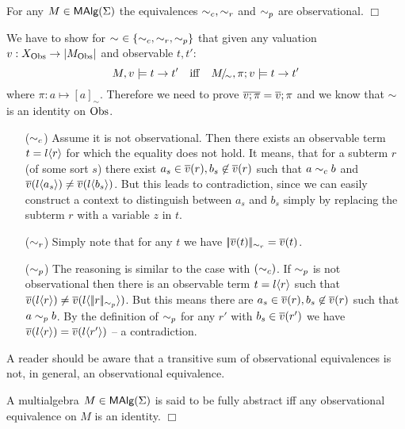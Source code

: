 \begin{Lemma}
For any $M \in \mbox{\rm\sf MAlg}(\Sigma)$ the equivalences $\sim_c, \sim_r$ and $\sim_p$ are
observational. 
\hfill$\Box$
\end{Lemma}

\begin{Proof} We have to show for $\sim\ \in \{\sim_c,\sim_r,\sim_p\}$ that given
any valuation $v: X_{\rm Obs} \rightarrow |M_{\rm Obs}|$ and observable $t,t'$:
\[
M,v \models t \rightarrow t' \quad {\rm iff} \quad 
                         M\!{\textstyle /}\!_{\sim} ,\pi;v \models t \rightarrow t'
\]
where $\pi: a \mapsto [a]_{\sim}$. Therefore we need to prove
$\mbox{$\overline{v;\pi}$} = \mbox{$\overline{v}$};\pi$ and we know that $\sim$ is an identity on
$\rm Obs$.
\begin{itemize}
\item[($\sim_c$)] Assume it is not observational. Then there exists an
observable term $t = l\langle r\rangle $ for which the equality does not hold. It
means, that for a subterm $r$ (of some sort $s$) there exist $a_s \in
\mbox{$\overline{v}$}(r), b_s \not\in \mbox{$\overline{v}$}(r)$ such that $a \sim_c b$ and
$\mbox{$\overline{v}$}(l\langle a_s\rangle ) \not= \mbox{$\overline{v}$}(l\langle b_s\rangle )$. But this leads to
contradiction, since we can easily construct a context to distinguish
between $a_s$ and $b_s$ simply by replacing the subterm $r$ with a
variable $z$ in $t$.
\item[($\sim_r$)] 
Simply note that for any $t$ we have $|\!|\mbox{$\overline{v}$}(t)|\!|_{\sim_r} =
\mbox{$\overline{v}$}(t)$.
\item[($\sim_p$)] The reasoning is similar to the case with
$(\sim_c)$. If $\sim_p$ is not observational then there is an observable
term $t = l\langle r\rangle $ such that $\mbox{$\overline{v}$}(l\langle r\rangle ) \not= 
\mbox{$\overline{v}$}(l\langle |\!|r|\!|_{\sim_p}\rangle )$. But this means there are  $a_s \in
\mbox{$\overline{v}$}(r), b_s \not\in \mbox{$\overline{v}$}(r)$ such that $a \sim_p b$. By the
definition of $\sim_p$ for any $r'$ with $b_s \in \mbox{$\overline{v}$}(r')$ we have
$\mbox{$\overline{v}$}(l\langle r\rangle ) = \mbox{$\overline{v}$}(l\langle r'\rangle )$ -- a contradiction.
\end{itemize}
\end{Proof}
A reader should be aware that a transitive sum of observational
equivalences is not, in general, an observational equivalence.

\begin{Definition}
A multialgebra $M \in \mbox{\rm\sf MAlg}(\Sigma)$ is said to be fully abstract iff
any observational equivalence on $M$ is an identity.
\hfill$\Box$
\end{Definition}



%

